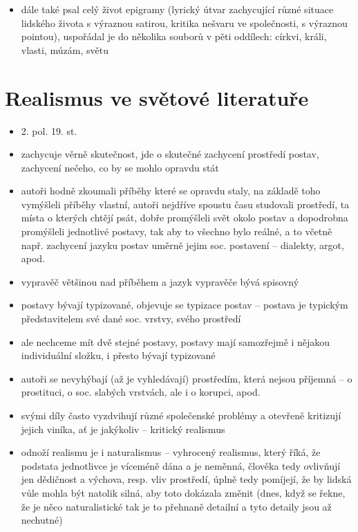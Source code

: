 \documentclass{article}
\begin{document}
\begin{itemize}
\begin{itemize}
  \end{itemize}
  \item dále také psal celý život epigramy (lyrický útvar zachycující různé situace lidského života s výraznou satirou, kritika nešvaru ve společnosti, s výraznou pointou), uspořádal je do několika souborů v pěti oddílech: církvi, králi, vlasti, múzám, světu
\end{itemize}

\part{Realismus ve světové literatuře}
\begin{itemize}
  \item 2. pol. 19. st.
  \item zachycuje věrně skutečnost, jde o skutečné zachycení prostředí postav, zachycení nečeho, co by se mohlo opravdu stát
  \item autoři hodně zkoumali příběhy které se opravdu staly, na základě toho vymýšleli příběhy vlastní, autoři nejdříve spoustu času studovali prostředí, ta místa o kterých chtějí psát, dobře promýšleli svět okolo postav a dopodrobna promýšleli jednotlivé postavy, tak aby to všechno bylo reálné, a to včetně např. zachycení jazyku postav uměrně jejim soc. postavení -- dialekty, argot, apod.
  \item vypravěč většinou nad příběhem a jazyk vypravěče bývá spisovný
  \item postavy bývají typizované, objevuje se typizace postav -- postava je typickým představitelem své dané soc. vrstvy, svého prostředí
  \item ale nechceme mít dvě stejné postavy, postavy mají samozřejmě i nějakou individuální složku, i přesto bývají typizované
  \item autoři se nevyhýbají (až je vyhledávají) prostředím, která nejsou příjemná -- o prostituci, o soc. slabých vrstvách, ale i o korupci, apod.
  \item svými díly často vyzdvihují různé společenské problémy a otevřeně kritizují jejich viníka, ať je jakýkoliv -- kritický realismus
  \item odnoží realismu je i naturalismus -- vyhrocený realismus, který říká, že podstata jednotlivce je víceméně dána a je neměnná, člověka tedy ovlivňují jen dědičnost a výchova, resp. vliv prostředí, úplně tedy pomíjejí, že by lidská vůle mohla být natolik silná, aby toto dokázala změnit (dnes, když se řekne, že je něco naturalistické tak je to přehnaně detailní a tyto detaily jsou až nechutné)
\end{itemize}
\end{document}
